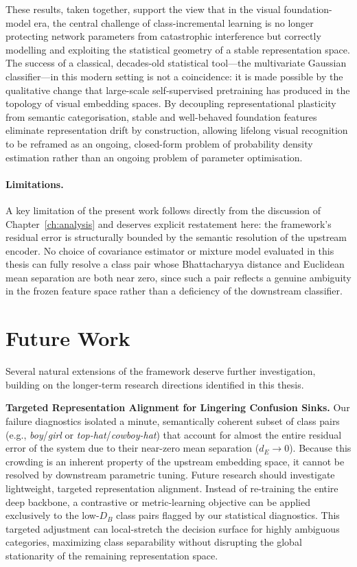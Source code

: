 These results, taken together, support the view that in the visual foundation-model era, the central challenge of class-incremental learning is no longer protecting network parameters from catastrophic interference but correctly modelling and exploiting the statistical geometry of a stable representation space. The success of a classical, decades-old statistical tool---the multivariate Gaussian classifier---in this modern setting is not a coincidence: it is made possible by the qualitative change that large-scale self-supervised pretraining has produced in the topology of visual embedding spaces. By decoupling representational plasticity from semantic categorisation, stable and well-behaved foundation features eliminate representation drift by construction, allowing lifelong visual recognition to be reframed as an ongoing, closed-form problem of probability density estimation rather than an ongoing problem of parameter optimisation.

\paragraph{Limitations.} A key limitation of the present work follows directly from the discussion of Chapter~\ref{ch:analysis} and deserves explicit restatement here: the framework's residual error is structurally bounded by the semantic resolution of the upstream encoder. No choice of covariance estimator or mixture model evaluated in this thesis can fully resolve a class pair whose Bhattacharyya distance and Euclidean mean separation are both near zero, since such a pair reflects a genuine ambiguity in the frozen feature space rather than a deficiency of the downstream classifier.

\section{Future Work}

Several natural extensions of the framework deserve further investigation, building on the longer-term research directions identified in this thesis.

\textbf{Targeted Representation Alignment for Lingering Confusion Sinks.} 
Our failure diagnostics isolated a minute, semantically coherent subset of class pairs (e.g., \textit{boy}/\textit{girl} or \textit{top-hat}/\textit{cowboy-hat}) that account for almost the entire residual error of the system due to their near-zero mean separation ($d_E \to 0$). Because this crowding is an inherent property of the upstream embedding space, it cannot be resolved by downstream parametric tuning. Future research should investigate lightweight, targeted representation alignment. Instead of re-training the entire deep backbone, a contrastive or metric-learning objective can be applied exclusively to the low-$D_B$ class pairs flagged by our statistical diagnostics. This targeted adjustment can local-stretch the decision surface for highly ambiguous categories, maximizing class separability without disrupting the global stationarity of the remaining representation space.

